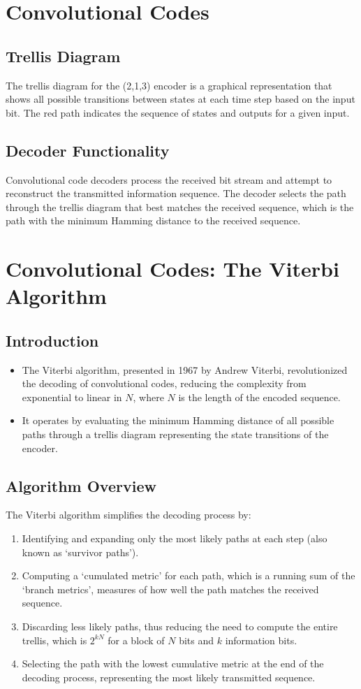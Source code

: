 \section*{Convolutional Codes}

\subsection*{Trellis Diagram}
The trellis diagram for the (2,1,3) encoder is a graphical representation that shows all possible transitions between states at each time step based on the input bit. The red path indicates the sequence of states and outputs for a given input.
\subsection*{Decoder Functionality}
Convolutional code decoders process the received bit stream and attempt to reconstruct the transmitted information sequence. The decoder selects the path through the trellis diagram that best matches the received sequence, which is the path with the minimum Hamming distance to the received sequence.
\section*{Convolutional Codes: The Viterbi Algorithm}

\subsection*{Introduction}
\begin{itemize}
  \item The Viterbi algorithm, presented in 1967 by Andrew Viterbi, revolutionized the decoding of convolutional codes, reducing the complexity from exponential to linear in \( N \), where \( N \) is the length of the encoded sequence.
  \item It operates by evaluating the minimum Hamming distance of all possible paths through a trellis diagram representing the state transitions of the encoder.
\end{itemize}

\subsection*{Algorithm Overview}
The Viterbi algorithm simplifies the decoding process by:
\begin{enumerate}
  \item Identifying and expanding only the most likely paths at each step (also known as `survivor paths').
  \item Computing a `cumulated metric' for each path, which is a running sum of the `branch metrics', measures of how well the path matches the received sequence.
  \item Discarding less likely paths, thus reducing the need to compute the entire trellis, which is \( 2^{kN} \) for a block of \( N \) bits and \( k \) information bits.
  \item Selecting the path with the lowest cumulative metric at the end of the decoding process, representing the most likely transmitted sequence.
\end{enumerate}

